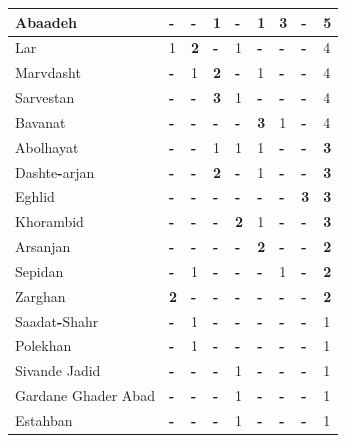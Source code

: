 \documentclass[11pt]{article}
\begin{document}
\begin{table}
\begin{tabular}{|l|l|l|l|l|l|l|l|l|}
\hline
Abaadeh & \textbf{-} & \textbf{-} & 1 & \textbf{-} & 1 & \textbf{3} & \textbf{-} & 5 \\
\hline
Lar & 1 & \textbf{\textbf{\textbf{2}}} & \textbf{-} & 1 & \textbf{-} & \textbf{-} & \textbf{-} & 4 \\
\hline
Marvdasht & \textbf{-} & 1 & \textbf{\textbf{\textbf{2}}} & \textbf{-} & 1 & \textbf{-} & \textbf{-} & 4 \\
\hline
Sarvestan & \textbf{-} & \textbf{-} & \textbf{3} & 1 & \textbf{-} & \textbf{-} & \textbf{-} & 4 \\
\hline
Bavanat & \textbf{-} & \textbf{-} & \textbf{-} & \textbf{-} & \textbf{3} & 1 & \textbf{-} & 4 \\
\hline
Abolhayat & \textbf{-} & \textbf{-} & 1 & 1 & 1 & \textbf{-} & \textbf{-} & \textbf{3} \\
\hline
Dashte\textbf{-}arjan & \textbf{-} & \textbf{-} & \textbf{\textbf{\textbf{2}}} & \textbf{-} & 1 & \textbf{-} & \textbf{-} & \textbf{3} \\
\hline
Eghlid & \textbf{-} & \textbf{-} & \textbf{-} & \textbf{-} & \textbf{-} & \textbf{-} & \textbf{3} & \textbf{3} \\
\hline
Khorambid & \textbf{-} & \textbf{-} & \textbf{-} & \textbf{\textbf{\textbf{2}}} & 1 & \textbf{-} & \textbf{-} & \textbf{3} \\
\hline
Arsanjan & \textbf{-} & \textbf{-} & \textbf{-} & \textbf{-} & \textbf{\textbf{\textbf{2}}} & \textbf{-} & \textbf{-} & \textbf{\textbf{\textbf{2}}} \\
\hline
Sepidan & \textbf{-} & 1 & \textbf{-} & \textbf{-} & \textbf{-} & 1 & \textbf{-} & \textbf{\textbf{\textbf{2}}} \\
\hline
Zarghan & \textbf{\textbf{\textbf{2}}} & \textbf{-} & \textbf{-} & \textbf{-} & \textbf{-} & \textbf{-} & \textbf{-} & \textbf{\textbf{\textbf{2}}} \\
\hline
Saadat\textbf{-}Shahr & \textbf{-} & 1 & \textbf{-} & \textbf{-} & \textbf{-} & \textbf{-} & \textbf{-} & 1 \\
\hline
Polekhan & \textbf{-} & 1 & \textbf{-} & \textbf{-} & \textbf{-} & \textbf{-} & \textbf{-} & 1 \\
\hline
Sivande Jadid & \textbf{-} & \textbf{-} & \textbf{-} & 1 & \textbf{-} & \textbf{-} & \textbf{-} & 1 \\
\hline
Gardane Ghader Abad & \textbf{-} & \textbf{-} & \textbf{-} & 1 & \textbf{-} & \textbf{-} & \textbf{-} & 1 \\
\hline
Estahban & \textbf{-} & \textbf{-} & \textbf{-} & 1 & \textbf{-} & \textbf{-} & \textbf{-} & 1 \\

\end{tabular}
\end{table}
\end{document}
